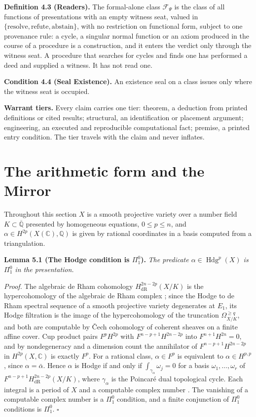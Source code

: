 \documentclass[10pt,twocolumn]{article}
\begin{document}
\textbf{Definition 4.3 (Readers).} The formal-alone class
\(\mathcal{F}_\Psi\) is the class of all functions of presentations with
an empty witness seat, valued in
\(\{\text{resolve},\text{refute},\text{abstain}\}\), with no restriction
on functional form, subject to one provenance rule: a cycle, a singular
normal function or an axiom produced in the course of a procedure is a
construction, and it enters the verdict only through the witness seat. A
procedure that searches for cycles and finds one has performed a deed
and supplied a witness. It has not read one.

\textbf{Condition 4.4 (Seal Existence).} An existence seal on a class
issues only where the witness seat is occupied.

\textbf{Warrant tiers.} Every claim carries one tier: theorem, a
deduction from printed definitions or cited results; structural, an
identification or placement argument; engineering, an executed and
reproducible computational fact; premise, a printed entry condition. The
tier travels with the claim and never inflates.

\hypertarget{the-arithmetic-form-and-the-mirror}{%
\section{The arithmetic form and the
Mirror}\label{the-arithmetic-form-and-the-mirror}}

Throughout this section \(X\) is a smooth projective variety over a
number field \(K\subset\overline{\mathbb{Q}}\) presented by homogeneous
equations, \(0\le p\le n\), and
\(\alpha\in H^{2p}(X(\mathbb{C}),\mathbb{Q})\) is given by rational
coordinates in a basis computed from a triangulation.

\textbf{Lemma 5.1 (The Hodge condition is \(\Pi^0_1\)).} \emph{The
predicate \(\alpha\in\operatorname{Hdg}^p(X)\) is \(\Pi^0_1\) in the
presentation.}

\emph{Proof.} The algebraic de Rham cohomology
\(H^{2n-2p}_{\mathrm{dR}}(X/K)\) is the hypercohomology of the algebraic
de Rham complex \cite{grothendieck1966}; since the Hodge to de Rham
spectral sequence of a smooth projective variety degenerates at \(E_1\),
its Hodge filtration is the image of the hypercohomology of the
truncation \(\Omega^{\ge q}_{X/K}\), and both are computable by Čech
cohomology of coherent sheaves on a finite affine cover. Cup product
pairs \(F^pH^{2p}\) with \(F^{n-p+1}H^{2n-2p}\) into
\(F^{n+1}H^{2n}=0\), and by nondegeneracy and a dimension count the
annihilator of \(F^{n-p+1}H^{2n-2p}\) in \(H^{2p}(X,\mathbb{C})\) is
exactly \(F^p\). For a rational class, \(\alpha\in F^p\) is equivalent
to \(\alpha\in H^{p,p}\), since \(\alpha=\bar\alpha\). Hence \(\alpha\)
is Hodge if and only if \(\int_{\gamma_\alpha}\omega_j=0\) for a basis
\(\omega_1,\dots,\omega_r\) of
\(F^{n-p+1}H^{2n-2p}_{\mathrm{dR}}(X/K)\), where \(\gamma_\alpha\) is
the Poincaré dual topological cycle. Each integral is a period of \(X\)
and a computable complex number \cite{kz2001}. The vanishing of a
computable complex number is a \(\Pi^0_1\) condition, and a finite
conjunction of \(\Pi^0_1\) conditions is \(\Pi^0_1\). \(\square\)
\end{document}
